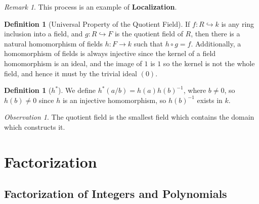 \documentclass[12pt]{article}
\theoremstyle{definition}
\newtheorem{defn}[thm]{Definition}
\theoremstyle{remark}
\newtheorem{rmk}[thm]{Remark}
\newtheorem{obs}[thm]{Observation}
\numberwithin{equation}{section}
\newcommand\B[1]{\textbf{ #1}}
\begin{document}
\begin{rmk}
        This process is an example of \B{Localization}.
\end{rmk}


\vspace{15pt}

\begin{defn}[Universal Property of the Quotient Field]
        If $f:R \hookrightarrow k$ is any ring inclusion into a field, and $g:R \hookrightarrow F$ is the quotient field of $R$, then there is a natural homomorphism of fields $h:F \rightarrow k$ such that $h\circ g = f$. Additionally, a homomorphism of fields is always injective since the kernel of a field homomorphism is an ideal, and the image of $1$ is $1$ so the kernel is not the whole field, and hence it must by the trivial ideal $(0)$.
\end{defn}
\begin{figure}[H]
        \centering
\end{figure}

\vspace{15pt}

\begin{defn}[$h^*$]
        We define $h^*(a/b) = h(a)h(b)^{-1}$, where $b \neq 0$, so $h(b) \neq 0$ since $h$ is an injective homomorphism, so $h(b)^{-1}$ exists in $k$.
\end{defn}

\vspace{15pt}

\begin{obs}
        The quotient field is the smallest field which contains the domain which constructs it.
\end{obs}



\clearpage

\section{Factorization}

\subsection{Factorization of Integers and Polynomials}
\end{document}
